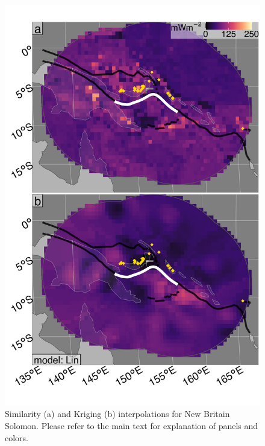 \begin{figure}[htbp]

{\centering \includegraphics[width=1\linewidth,]{assets/figs/chpt3/NewBritainSolomonDiffComp} 

}

\caption[Similarityand Kriging interpolations for New Britain Solomon]{Similarity (a) and Kriging (b) interpolations for New Britain Solomon. Please refer to the main text for explanation of panels and colors.}\label{fig:newBritainSolomonDiff}
\end{figure}

